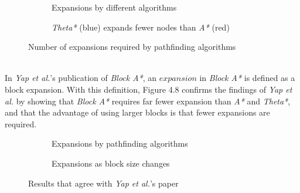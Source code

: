 \documentclass[12pt,notitlepage]{report}
\begin{document}
\begin{figure}
\centering
  \begin{subfigure}[b]{0.49\textwidth}
  \centering
  
  \caption{Expansions by different algorithms}
  \end{subfigure}
  \begin{subfigure}[b]{0.49\textwidth}
  \centering
  \caption{{\em Theta*} (blue) expands fewer nodes than {\em A*} (red)}
  \end{subfigure}
\caption{Number of expansions required by pathfinding algorithms}
\end{figure}

\\
\noindent
In {\em Yap et al.}'s publication of {\em Block A*}, an $expansion$ in {\em Block A*} is defined as a block expansion. With this definition,  Figure 4.8 confirms the findings of {\em Yap et al.} by showing that {\em Block A*} requires far fewer expansion than {\em A*} and {\em Theta*}, and that the advantage of using larger blocks is that fewer expansions are required.\\

\begin{figure}
\centering
  \begin{subfigure}{0.49\textwidth}
  \centering
  
  \caption{Expansions by pathfinding algorithms}
  \end{subfigure}
  \begin{subfigure}{0.49\textwidth}
  \centering
  
  \caption{Expansions as block size changes}
  \end{subfigure}
\caption{Results that agree with {\em Yap et al.}'s paper}
\end{figure}
\end{document}
